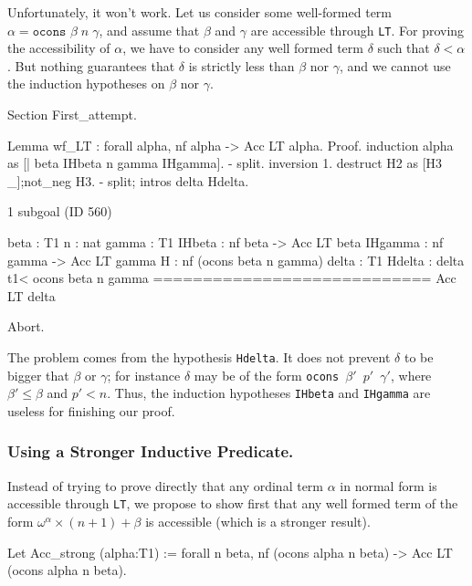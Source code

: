 Unfortunately, it won't work. Let us consider some well-formed term
 $\alpha=\texttt{ocons $\beta\;n\;\gamma$}$, and assume that \(\beta\) and \(\gamma\) are accessible
 through \texttt{LT}. For proving the accessibility of $\alpha$, we have to consider
any well formed term \(\delta\) such that \(\delta<\alpha\). 
But nothing guarantees that \(\delta\)  is strictly  less than \(\beta\) nor \(\gamma\), and we cannot use the induction hypotheses on   \(\beta\) nor \(\gamma\).

\begin{Coqbad}
Section First_attempt.

 Lemma wf_LT : forall alpha,  nf alpha -> Acc LT alpha. 
 Proof.
  induction alpha as [| beta IHbeta n gamma IHgamma].
  - split.
    inversion 1.
    destruct H2 as [H3 _];not_neg H3.
  -  split; intros delta Hdelta.
\end{Coqbad}

\begin{Coqanswer}
1 subgoal (ID 560)
  
  beta : T1
  n : nat
  gamma : T1
  IHbeta : nf beta -> Acc LT beta
  IHgamma : nf gamma -> Acc LT gamma
  H : nf (ocons beta n gamma)
  delta : T1
  Hdelta : delta t1< ocons beta n gamma
  ============================
  Acc LT delta
 \end{Coqanswer}

\begin{Coqbad}
  Abort.
\end{Coqbad}

The problem comes from the hypothesis \texttt{Hdelta}. It does not prevent  \(\delta\) to be bigger that \(\beta\) or
\(\gamma\);
for instance \(\delta\) may be of the form
\texttt{ocons $\beta'$ $p'$  $\gamma'$},
where  \(\beta' \leq  \beta\) and  \(p' < n\).
Thus, the induction hypotheses \texttt{IHbeta} and \texttt{IHgamma}  are useless for finishing our proof.

\subsubsection{Using a Stronger Inductive Predicate.}
\label{sec:orgheadline78}
  Instead of trying to prove directly that any ordinal term \(\alpha\) in normal form is accessible
through \texttt{LT}, we propose to show first that any well formed 
term of the form \(\omega^\alpha\times(n+1)+\beta\) is accessible (which is a stronger result).

\begin{Coqsrc}
 Let Acc_strong (alpha:T1) :=
      forall n beta, 
        nf (ocons alpha n beta) -> Acc LT (ocons alpha  n beta).
\end{Coqsrc}

